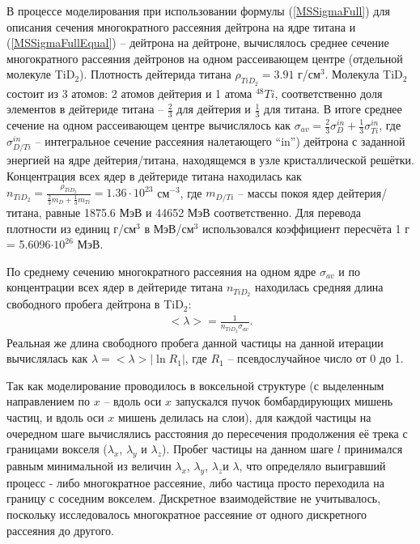 \documentclass[a4paper,12pt]{article}
\begin{document}
\begin{large}
  В процессе моделирования при использовании формулы (\ref{MSSigmaFull}) для описания сечения многократного рассеяния дейтрона на ядре титана и (\ref{MSSigmaFullEqual}) -- дейтрона на дейтроне, вычислялось среднее сечение многократного рассеяния дейтронов на одном рассеивающем центре (отдельной молекуле TiD$_2$).
  Плотность дейтерида титана $\rho_{TiD_2}=3.91$ г/см$^3$. Молекула TiD$_2$ состоит из 3 атомов: 2 атомов дейтерия и 1 атома $^{48}Ti$, соответственно доля элементов в дейтериде титана -- $\frac{2}{3}$ для дейтерия и $\frac{1}{3}$ для титана.
  В итоге среднее сечение на одном рассеивающем центре вычислялось как $\sigma_{av}=\frac{2}{3}\sigma_D^{in} +\frac{1}{3}\sigma_{Ti}^{in}$, где $\sigma_{D/Ti}^{in}$ -- интегральное сечение рассеяния налетающего ``in'') дейтрона с заданной энергией на ядре дейтерия/титана, находящемся в узле кристаллической решётки.
  Концентрация всех ядер в дейтериде титана находилась как $n_{TiD_2}=\frac{\rho_{TiD_2}}{\frac{2}{3}m_D +\frac{1}{3}m_{Ti}}=1.36 \cdot 10^{23}$ см$^{-3}$, где $m_{D/Ti}$ -- массы покоя ядер дейтерия/титана, равные 1875.6 МэВ и 44652 МэВ соответственно.
  Для перевода плотности из единиц г/см$^3$ в МэВ/см$^3$ использовался коэффициент пересчёта 1 г = 5.6096$\cdot 10^{26}$ МэВ.

По среднему сечению многократного рассеяния на одном ядре $\sigma_{av}$ и по концентрации всех ядер в дейтериде титана $n_{TiD_2}$ находилась средняя длина свободного пробега дейтрона в TiD$_2$:
\begin{equation}
\label{MSMeanFreePath}
\begin{aligned} 
<\lambda>= \frac{1}{n_{TiD_2} \sigma_{av}}.
\end{aligned}
\end{equation}  
Реальная же длина свободного пробега данной частицы на данной итерации вычислялась как
$\lambda=<\lambda> |\ln{R_1}|$, где $R_1$ -- псевдослучайное число от 0 до 1.

  Так как моделирование проводилось в воксельной структуре (с выделенным направлением по $x$ -- вдоль оси $x$ запускался пучок бомбардирующих мишень частиц, и вдоль оси $x$ мишень делилась на слои), для каждой частицы на очередном шаге вычислялись расстояния до пересечения продолжения её трека с границами вокселя ($\lambda_x$, $\lambda_y$ и $\lambda_z$).
  Пробег частицы на данном шаге $l$ принимался равным минимальной из величин  $\lambda_x$, $\lambda_y$, $\lambda_z$и $\lambda$, что определяло выигравший процесс - либо многократное рассеяние, либо частица просто переходила на границу с соседним вокселем.
  Дискретное взаимодействие не учитывалось, поскольку исследовалось многократное рассеяние от одного дискретного рассеяния до другого.


\end{large}
\end{document}
